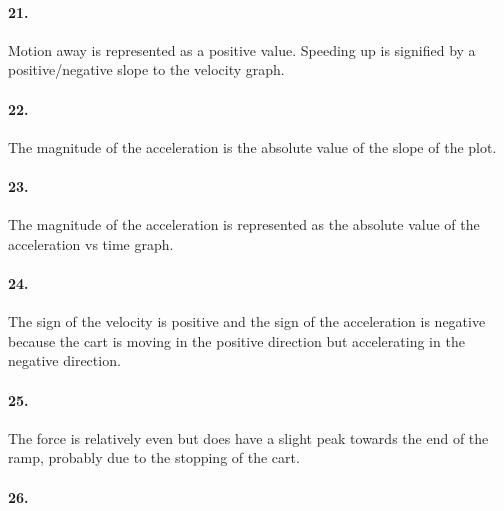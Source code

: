    \paragraph*{21.}

    \begin{mdframed}
        Motion away is represented as a positive value. Speeding up is signified by a positive/negative slope to the velocity graph.
    \end{mdframed}

    \paragraph*{22.}

    \begin{mdframed}
        The magnitude of the acceleration is the absolute value of the slope of the plot.
    \end{mdframed}

    \paragraph*{23.}

    \begin{mdframed}
        The magnitude of the acceleration is represented as the absolute value of the acceleration vs time graph.
    \end{mdframed}

    \paragraph*{24.}

    \begin{mdframed}
        The sign of the velocity is positive and the sign of the acceleration is negative because the cart is moving in the positive direction but accelerating in the negative direction.
    \end{mdframed}

    \paragraph*{25.}

    \begin{mdframed}
        The force is relatively even but does have a slight peak towards the end of the ramp, probably due to the stopping of the cart.
    \end{mdframed}

    \paragraph*{26.}

